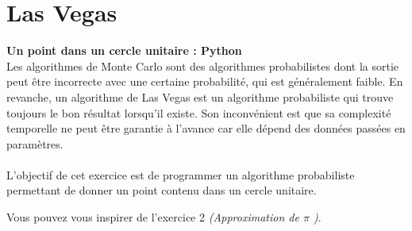 \newpage
\section{Las Vegas}

\begin{Exercice}[10 minutes]\textbf{Un point dans un cercle unitaire : Python} \optionnel\\
    Les algorithmes de Monte Carlo sont des algorithmes probabilistes dont la sortie peut être incorrecte avec une certaine probabilité, qui est généralement faible. En revanche, un algorithme de Las Vegas est un algorithme probabiliste qui trouve toujours le bon résultat lorsqu'il existe. Son inconvénient est que sa complexité temporelle ne peut être garantie à l'avance car elle dépend des données passées en paramètres.\\ \\
    L'objectif de cet exercice est de programmer un algorithme probabiliste permettant de donner un point contenu dans un cercle unitaire. 
    
    \begin{conseil}
       Vous pouvez vous inspirer de l'exercice 2 \textit{(Approximation de $\pi$ )}.
    \end{conseil}
    \begin{solution}
     
    \end{solution}
    \end{Exercice}

